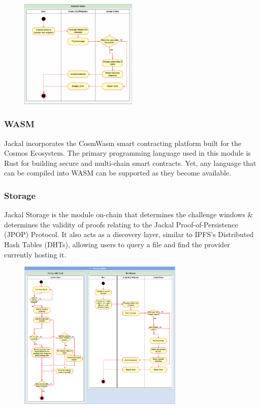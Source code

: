 \documentclass[a4paper]{article}
\begin{document}
\begin{figure}[!htbp]
\centering
\includegraphics[width=0.5\textwidth]{assets/rns7.png}
\caption{}
\end{figure}

\newpage
\subsubsection{WASM}
Jackal incorporates the CosmWasm \cite{cosmwasm} smart contracting platform built for the Cosmos Ecosystem. The primary programming language used in this module is Rust for building secure and multi-chain smart contracts. Yet, any language that can be compiled into WASM can be supported as they become available. 

\subsubsection{Storage}
Jackal Storage is the module on-chain that determines the challenge windows \& determines the validity of proofs relating to the Jackal Proof-of-Persistence (JPOP) Protocol. It also acts as a discovery layer, similar to IPFS's Distributed Hash Tables (DHTs), allowing users to query a file and find the provider currently hosting it. \cite{dht}
\begin{figure}[!htbp]
\centering
\includegraphics[width=0.7\textwidth]{assets/storage1.png}
\caption{}
\end{figure}
\end{document}
